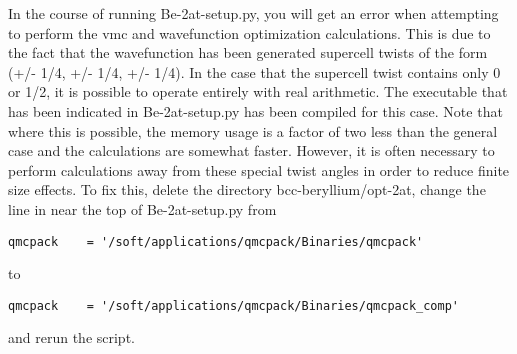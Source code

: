 In the course of running Be-2at-setup.py, you will get an error when attempting to perform the vmc and wavefunction optimization calculations.  This is due to the fact that the wavefunction has been generated supercell twists of the form (+/- 1/4, +/- 1/4, +/- 1/4).  In the case that the supercell twist contains only 0 or 1/2, it is possible to operate entirely with real arithmetic.  The executable that has been indicated in Be-2at-setup.py has been compiled for this case.  Note that where this is possible, the memory usage is a factor of two less than the general case and the calculations are somewhat faster.  However, it is often necessary to perform calculations away from these special twist angles in order to reduce finite size effects.  To fix this, delete the directory bcc-beryllium/opt-2at, change the line in near the top of Be-2at-setup.py from 
\begin{lstlisting}[style=Python]
qmcpack    = '/soft/applications/qmcpack/Binaries/qmcpack'
\end{lstlisting}
to
\begin{lstlisting}[style=Python]
qmcpack    = '/soft/applications/qmcpack/Binaries/qmcpack_comp'
\end{lstlisting}
and rerun the script.

